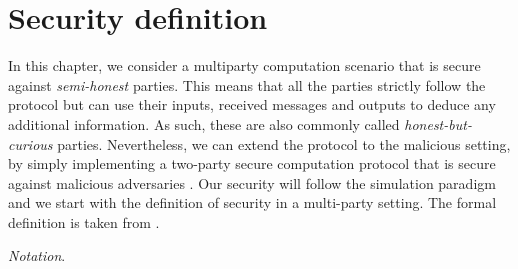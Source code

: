 




\section{Security definition} \label{secDefition}

In this chapter, we consider a multiparty computation scenario that is secure against \textit{semi-honest} parties. This means that all the parties strictly follow the protocol but can use their inputs, received messages and outputs to deduce any additional information. As such, these are also commonly called \textit{honest-but-curious} parties. Nevertheless, we can extend the protocol to the malicious setting, by simply implementing a two-party secure computation protocol that is secure against malicious adversaries \cite{Evans2018}. Our security will follow the simulation paradigm and we start with the definition of security in a multi-party setting. The formal definition is taken from \cite{Evans2018}.

\textit{Notation}. 


